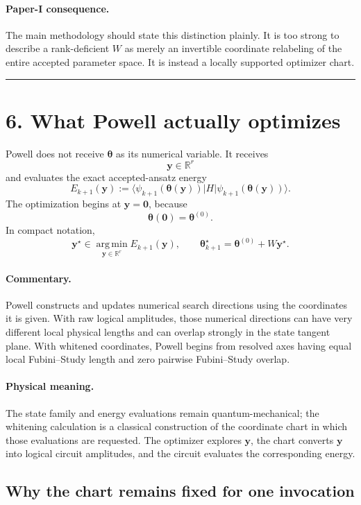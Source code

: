 \documentclass[11pt]{article}
\newcommand{\ket}[1]{\lvert #1\rangle}
\newcommand{\bra}[1]{\langle #1\rvert}
\newcommand{\R}{\mathbb R}
\newcommand{\conceptbreak}{%
  \par\medskip\noindent
  {\color{black!30}\rule{\textwidth}{0.35pt}}%
  \par\medskip}
\newcommand{\commentary}{\paragraph{Commentary.}}
\newcommand{\physical}{\paragraph{Physical meaning.}}
\newcommand{\paperone}{\paragraph{Paper-I consequence.}}
\begin{document}
\paperone The main methodology should state this distinction plainly.  It is
too strong to describe a rank-deficient \(W\) as merely an invertible
coordinate relabeling of the entire accepted parameter space.  It is instead
a locally supported optimizer chart.

\conceptbreak

\section*{6. What Powell actually optimizes}

Powell does not receive \(\boldsymbol\theta\) as its numerical variable.  It
receives
\begin{equation}
\mathbf y\in\R^r
\end{equation}
and evaluates the exact accepted-ansatz energy
\begin{equation}
E_{k+1}(\mathbf y)
:=
\bra{\psi_{k+1}(\boldsymbol\theta(\mathbf y))}
H
\ket{\psi_{k+1}(\boldsymbol\theta(\mathbf y))}.
\label{eq:powell-energy}
\end{equation}
The optimization begins at
\(\mathbf y=\mathbf 0\), because
\begin{equation}
\boldsymbol\theta(\mathbf 0)
=
\boldsymbol\theta^{(0)}.
\end{equation}
In compact notation,
\begin{equation}
\mathbf y^\star
\in
\operatorname*{arg\,min}_{\mathbf y\in\R^r}
E_{k+1}(\mathbf y),
\qquad
\boldsymbol\theta_{k+1}^\star
=
\boldsymbol\theta^{(0)}+W\mathbf y^\star.
\label{eq:powell-endpoint}
\end{equation}

\commentary Powell constructs and updates numerical search directions using
the coordinates it is given.  With raw logical amplitudes, those numerical
directions can have very different local physical lengths and can overlap
strongly in the state tangent plane.  With whitened coordinates, Powell
begins from resolved axes having equal local Fubini--Study length and zero
pairwise Fubini--Study overlap.

\physical The state family and energy evaluations remain quantum-mechanical;
the whitening calculation is a classical construction of the coordinate
chart in which those evaluations are requested.  The optimizer explores
\(\mathbf y\), the chart converts \(\mathbf y\) into logical circuit
amplitudes, and the circuit evaluates the corresponding energy.

\subsection*{Why the chart remains fixed for one invocation}
\end{document}
